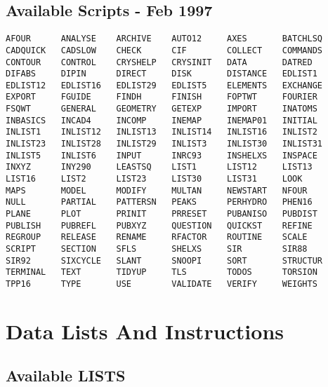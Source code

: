 \documentclass[10pt,a4paper]{report}
\begin{document}
\section{Available Scripts - Feb 1997}
\small\begin{verbatim}
AFOUR      ANALYSE    ARCHIVE    AUTO12     AXES       BATCHLSQ
CADQUICK   CADSLOW    CHECK      CIF        COLLECT    COMMANDS
CONTOUR    CONTROL    CRYSHELP   CRYSINIT   DATA       DATRED
DIFABS     DIPIN      DIRECT     DISK       DISTANCE   EDLIST1
EDLIST12   EDLIST16   EDLIST29   EDLIST5    ELEMENTS   EXCHANGE
EXPORT     FGUIDE     FINDH      FINISH     FOPTWT     FOURIER
FSQWT      GENERAL    GEOMETRY   GETEXP     IMPORT     INATOMS
INBASICS   INCAD4     INCOMP     INEMAP     INEMAP01   INITIAL
INLIST1    INLIST12   INLIST13   INLIST14   INLIST16   INLIST2
INLIST23   INLIST28   INLIST29   INLIST3    INLIST30   INLIST31
INLIST5    INLIST6    INPUT      INRC93     INSHELXS   INSPACE
INXYZ      INY290     LEASTSQ    LIST1      LIST12     LIST13
LIST16     LIST2      LIST23     LIST30     LIST31     LOOK
MAPS       MODEL      MODIFY     MULTAN     NEWSTART   NFOUR
NULL       PARTIAL    PATTERSN   PEAKS      PERHYDRO   PHEN16
PLANE      PLOT       PRINIT     PRRESET    PUBANISO   PUBDIST
PUBLISH    PUBREFL    PUBXYZ     QUESTION   QUICKST    REFINE
REGROUP    RELEASE    RENAME     RFACTOR    ROUTINE    SCALE
SCRIPT     SECTION    SFLS       SHELXS     SIR        SIR88
SIR92      SIXCYCLE   SLANT      SNOOPI     SORT       STRUCTUR
TERMINAL   TEXT       TIDYUP     TLS        TODOS      TORSION
TPP16      TYPE       USE        VALIDATE   VERIFY     WEIGHTS
\end{verbatim}\normalsize





\chapter{Data Lists And Instructions}


\section{Available LISTS}
\end{document}

